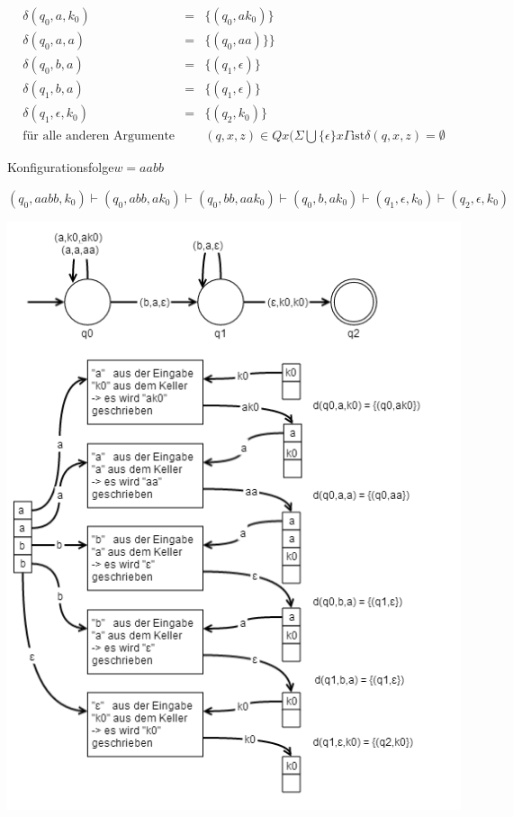 \begin{eqnarray}
\delta(q_{0},a,k_{0}) & = & \{(q_{0},ak_{0})\}\\
\delta(q_{0},a,a) & = & \{(q_{0},aa)\}\}\\
\delta(q_{0},b,a) & = & \{(q_{1},\epsilon)\}\\
\delta(q_{1},b,a) & = & \{(q_{1},\epsilon)\}\\
\delta(q_{1},\epsilon,k_{\text{0}}) & = & \{(q_{2},k_{0})\}\\
\text{für alle anderen Argumente} &  & (q,x,z)\in Qx(\Sigma\bigcup\{\epsilon\}x\Gamma\text{ist}\delta(q,x,z)=\emptyset
\end{eqnarray}


Konfigurationsfolge$w=aabb$

$(q_{0},aabb,k_{0})\vdash(q_{0},abb,ak_{0})\vdash(q_{0},bb,aak_{0})\vdash(q_{0},b,ak_{\text{0}})\vdash(q_{1},\epsilon,k_{0})\vdash(q_{2},\epsilon,k_{0})$

\includegraphics{kellerautomat}


